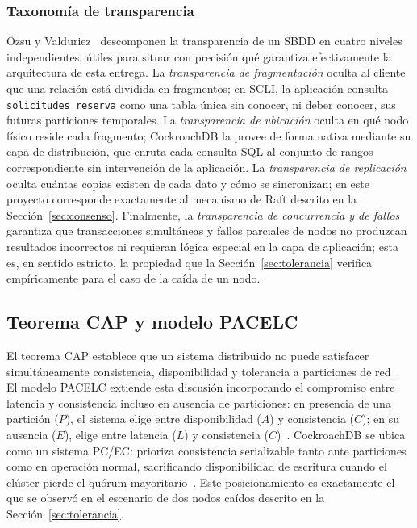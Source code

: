 \documentclass[10pt,twocolumn]{article}
\begin{document}
\subsubsection{Taxonomía de transparencia}

Özsu y Valduriez~\cite{ozsu2020} descomponen la transparencia de un SBDD en
cuatro niveles independientes, útiles para situar con precisión qué
garantiza efectivamente la arquitectura de esta entrega. La
\emph{transparencia de fragmentación} oculta al cliente que una relación
está dividida en fragmentos; en SCLI, la aplicación consulta
\texttt{solicitudes\_reserva} como una tabla única sin conocer, ni deber
conocer, sus futuras particiones temporales. La \emph{transparencia de
ubicación} oculta en qué nodo físico reside cada fragmento; CockroachDB la
provee de forma nativa mediante su capa de distribución, que enruta cada
consulta SQL al conjunto de rangos correspondiente sin intervención de la
aplicación. La \emph{transparencia de replicación} oculta cuántas copias
existen de cada dato y cómo se sincronizan; en este proyecto corresponde
exactamente al mecanismo de Raft descrito en la
Sección~\ref{sec:consenso}. Finalmente, la \emph{transparencia de
concurrencia y de fallos} garantiza que transacciones simultáneas y fallos
parciales de nodos no produzcan resultados incorrectos ni requieran lógica
especial en la capa de aplicación; esta es, en sentido estricto, la
propiedad que la Sección~\ref{sec:tolerancia} verifica empíricamente para
el caso de la caída de un nodo.

\subsection{Teorema CAP y modelo PACELC}

El teorema CAP establece que un sistema distribuido no puede satisfacer
simultáneamente consistencia, disponibilidad y tolerancia a particiones de
red~\cite{lee2023cap}. El modelo PACELC extiende esta discusión
incorporando el compromiso entre latencia y consistencia incluso en
ausencia de particiones: en presencia de una partición ($P$), el sistema
elige entre disponibilidad ($A$) y consistencia ($C$); en su ausencia
($E$), elige entre latencia ($L$) y consistencia ($C$)~\cite{abadi2012pacelc}.
CockroachDB se ubica como un sistema \mbox{PC/EC}: prioriza consistencia
serializable tanto ante particiones como en operación normal, sacrificando
disponibilidad de escritura cuando el clúster pierde el quórum
mayoritario~\cite{taft2020}. Este posicionamiento es exactamente el que se
observó en el escenario de dos nodos caídos descrito en la
Sección~\ref{sec:tolerancia}.
\end{document}
